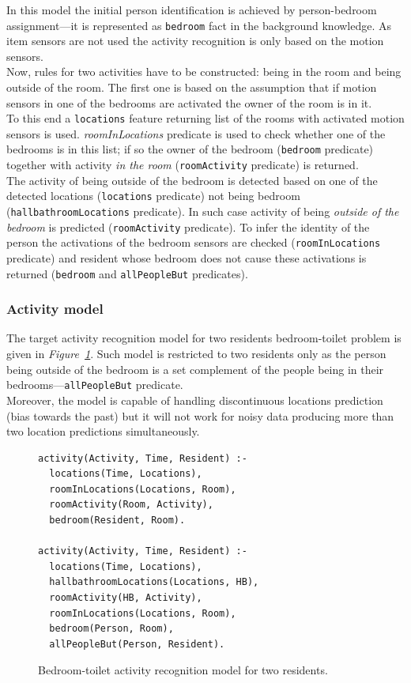 \documentclass[10pt, a4paper, pdflatex, leqno, twoside, openright]{report}
\begin{document}
In this model the initial person identification is achieved by person-bedroom assignment---it is represented as \texttt{bedroom} fact in the background knowledge. As item sensors are not used the activity recognition is only based on the motion sensors.\\

Now, rules for two activities have to be constructed: being in the room and being outside of the room. The first one is based on the assumption that if motion sensors in one of the bedrooms are activated the owner of the room is in it.\\
To this end a \texttt{locations} feature returning list of the rooms with activated motion sensors is used. \emph{roomInLocations} predicate is used to check whether one of the bedrooms is in this list; if so the owner of the bedroom (\texttt{bedroom} predicate) together with activity \emph{in the room} (\texttt{roomActivity} predicate) is returned.\\

The activity of being outside of the bedroom is detected based on one of the detected locations (\texttt{locations} predicate) not being bedroom (\texttt{hallbathroomLocations} predicate). In such case activity of being \emph{outside of the bedroom} is predicted (\texttt{roomActivity} predicate). To infer the identity of the person the activations of the bedroom sensors are checked (\texttt{roomInLocations} predicate) and resident whose bedroom does not cause these activations is returned (\texttt{bedroom} and \texttt{allPeopleBut} predicates).

      \subsubsection{Activity model}
The target activity recognition model for two residents bedroom-toilet problem is given in \emph{Figure~\ref{lst:BTtwo}}. Such model is restricted to two residents only as the person being outside of the bedroom is a set complement of the people being in their bedrooms---\texttt{allPeopleBut} predicate.\\
Moreover, the model is capable of handling discontinuous locations prediction (bias towards the past) but it will not work for noisy data producing more than two location predictions simultaneously.

\begin{figure}[htb]
  \begin{verbatim}
activity(Activity, Time, Resident) :-
  locations(Time, Locations),
  roomInLocations(Locations, Room),
  roomActivity(Room, Activity),
  bedroom(Resident, Room).

activity(Activity, Time, Resident) :-
  locations(Time, Locations),
  hallbathroomLocations(Locations, HB),
  roomActivity(HB, Activity),
  roomInLocations(Locations, Room),
  bedroom(Person, Room),
  allPeopleBut(Person, Resident).
  \end{verbatim}
  \caption{Bedroom-toilet activity recognition model for two residents.\label{lst:BTtwo}}
\end{figure}
\end{document}
